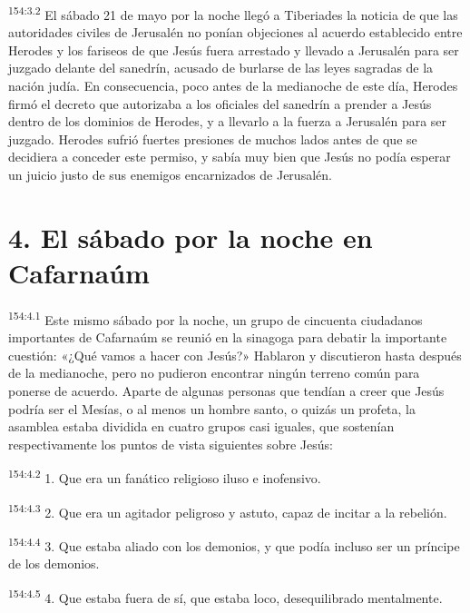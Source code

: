 \par 
\textsuperscript{154:3.2} El sábado 21 de mayo por la noche llegó a Tiberiades la noticia de que las autoridades civiles de Jerusalén no ponían objeciones al acuerdo establecido entre Herodes y los fariseos de que Jesús fuera arrestado y llevado a Jerusalén para ser juzgado delante del sanedrín, acusado de burlarse de las leyes sagradas de la nación judía. En consecuencia, poco antes de la medianoche de este día, Herodes firmó el decreto que autorizaba a los oficiales del sanedrín a prender a Jesús dentro de los dominios de Herodes, y a llevarlo a la fuerza a Jerusalén para ser juzgado. Herodes sufrió fuertes presiones de muchos lados antes de que se decidiera a conceder este permiso, y sabía muy bien que Jesús no podía esperar un juicio justo de sus enemigos encarnizados de Jerusalén.

\section*{4. El sábado por la noche en Cafarnaúm}
\par 
\textsuperscript{154:4.1} Este mismo sábado por la noche, un grupo de cincuenta ciudadanos importantes de Cafarnaúm se reunió en la sinagoga para debatir la importante cuestión: «¿Qué vamos a hacer con Jesús?» Hablaron y discutieron hasta después de la medianoche, pero no pudieron encontrar ningún terreno común para ponerse de acuerdo. Aparte de algunas personas que tendían a creer que Jesús podría ser el Mesías, o al menos un hombre santo, o quizás un profeta, la asamblea estaba dividida en cuatro grupos casi iguales, que sostenían respectivamente los puntos de vista siguientes sobre Jesús:

\par 
\textsuperscript{154:4.2} 1. Que era un fanático religioso iluso e inofensivo.

\par 
\textsuperscript{154:4.3} 2. Que era un agitador peligroso y astuto, capaz de incitar a la rebelión.

\par 
\textsuperscript{154:4.4} 3. Que estaba aliado con los demonios, y que podía incluso ser un príncipe de los demonios.

\par 
\textsuperscript{154:4.5} 4. Que estaba fuera de sí, que estaba loco, desequilibrado mentalmente.

